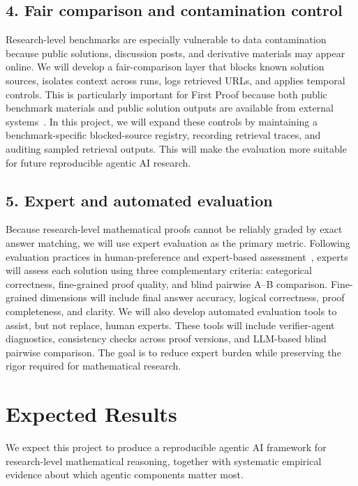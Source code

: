 \documentclass[11pt]{article}
\begin{document}
\subsection*{4. Fair comparison and contamination control}
\vspace{-7pt}
Research-level benchmarks are especially vulnerable to data contamination because public solutions, discussion posts, and derivative materials may appear online. We will develop a fair-comparison layer that blocks known solution sources, isolates context across runs, logs retrieved URLs, and applies temporal controls. This is particularly important for First Proof because both public benchmark materials and public solution outputs are available from external systems~\citep{abouzaid2026first,openai_first_proof_2025,aletheia}. In this project, we will expand these controls by maintaining a benchmark-specific blocked-source registry, recording retrieval traces, and auditing sampled retrieval outputs. This will make the evaluation more suitable for future reproducible agentic AI research.
\vspace{-7pt}
\subsection*{5. Expert and automated evaluation}
\vspace{-7pt}
Because research-level mathematical proofs cannot be reliably graded by exact answer matching, we will use expert evaluation as the primary metric. Following evaluation practices in human-preference and expert-based assessment~\citep{ouyang2022training,aletheia}, experts will assess each solution using three complementary criteria: categorical correctness, fine-grained proof quality, and blind pairwise A--B comparison. Fine-grained dimensions will include final answer accuracy, logical correctness, proof completeness, and clarity. We will also develop automated evaluation tools to assist, but not replace, human experts. These tools will include verifier-agent diagnostics, consistency checks across proof versions, and LLM-based blind pairwise comparison. The goal is to reduce expert burden while preserving the rigor required for mathematical research.
\vspace{-10pt}
\section*{Expected Results}
\vspace{-10pt}
We expect this project to produce a reproducible agentic AI framework for research-level mathematical reasoning, together with systematic empirical evidence about which agentic components matter most.
\end{document}
